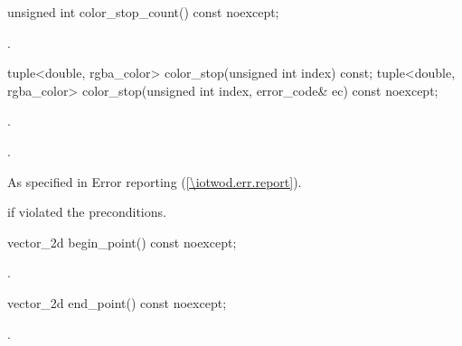 \begin{itemdecl}
    unsigned int color_stop_count() const noexcept;
\end{itemdecl}
\begin{itemdescr}
	\pnum
	\returns
	.

\end{itemdescr}

\begin{itemdecl}
    tuple<double, rgba_color> color_stop(unsigned int index) const;
    tuple<double, rgba_color> color_stop(unsigned int index,
      error_code& ec) const noexcept;
\end{itemdecl}
\begin{itemdescr}
	\pnum
	\requires
	.
	
	\pnum
	\returns
	.

	\pnum
	\throws
	As specified in Error reporting (\ref{\iotwod.err.report}).
	
	\pnum
	\errors
	 if  violated the preconditions.

\end{itemdescr}

\begin{itemdecl}
    vector_2d begin_point() const noexcept;
\end{itemdecl}
\begin{itemdescr}
	\pnum
	\returns
	.

\end{itemdescr}

\begin{itemdecl}
    vector_2d end_point() const noexcept;
\end{itemdecl}
\begin{itemdescr}
	\pnum
	\returns
	.

\end{itemdescr}
